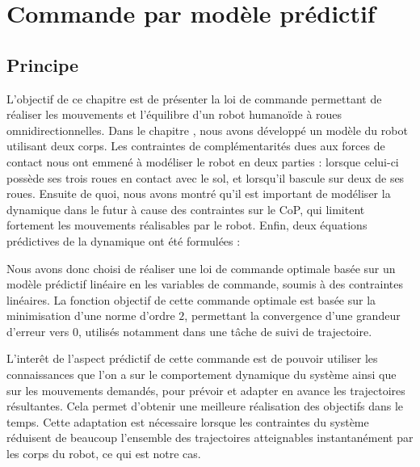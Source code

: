\chapter{Commande par modèle prédictif}
\label{chapitre.commande}
	\section{Principe}
	
		L'objectif de ce chapitre est de présenter la loi de commande permettant de réaliser les mouvements et l'équilibre d'un robot humanoïde à roues omnidirectionnelles.
		Dans le chapitre , nous avons développé un modèle du robot utilisant deux corps.
		Les contraintes de complémentarités dues aux forces de contact nous ont emmené à modéliser le robot en deux parties : lorsque celui-ci possède ses trois roues en contact avec le sol, et lorsqu'il bascule sur deux de ses roues.
		Ensuite de quoi, nous avons montré qu'il est important de modéliser la dynamique dans le futur à cause des contraintes sur le CoP, qui limitent fortement les mouvements réalisables par le robot.
		Enfin, deux équations prédictives de la dynamique ont été formulées :
		
		Nous avons donc choisi de réaliser une loi de commande optimale basée sur un modèle prédictif linéaire en les variables de commande, soumis à des contraintes linéaires.
		La fonction objectif de cette commande optimale est basée sur la minimisation d'une norme d'ordre $2$, permettant la convergence d'une grandeur d'erreur vers $0$, utilisés notamment dans une tâche de suivi de trajectoire.
		
		L'interêt de l'aspect prédictif de cette commande est de pouvoir utiliser les connaissances que l'on a sur le comportement dynamique du système ainsi que sur les mouvements demandés, pour prévoir et adapter en avance les trajectoires résultantes.
		Cela permet d'obtenir une meilleure réalisation des objectifs dans le temps. 
		Cette adaptation est nécessaire lorsque les contraintes du système réduisent de beaucoup l'ensemble des trajectoires atteignables instantanément par les corps du robot, ce qui est notre cas.
	
